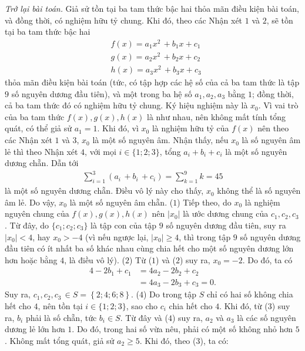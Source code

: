 \begin{multicols}{2}
	\vskip 0.05cm
	\textit{Trở lại bài toán.}
	\vskip 0.05cm
	Giả sử tồn tại ba tam thức bậc hai thỏa mãn điều kiện bài toán, và đồng thời, có nghiệm hữu tỷ chung.
	Khi đó, theo các Nhận xét $1$ và $2$, sẽ tồn tại ba tam thức bậc hai
	\begin{align*}
		&f\left( x \right) = {a_1}{x^2}\, + {b_1}x + {c_1}\\
		&g\left( x \right) = {a_2}{x^2}\, + {b_2}x + {c_2}\\
		&h\left( x \right) = {a_3}{x^2}\, + {b_3}x + {c_3}
	\end{align*}
	thỏa mãn điều kiện bài toán (tức, có tập hợp các hệ số của cả ba tam thức là tập $9$ số nguyên dương đầu tiên), và một trong ba hệ số $a_1, a_2, a_3$  bằng $1$; đồng thời, cả ba tam thức đó có nghiệm hữu tỷ chung. Ký hiệu nghiệm này là $x_0$.
	\vskip 0.05cm 
	Vì vai trò của ba tam thức $f(x), g(x), h(x)$ là như nhau, nên không mất tính tổng quát, có thể giả sử $a_1 =1$. Khi đó, vì $x_0$  là nghiệm hữu tỷ của $f(x)$  nên theo các Nhận xét $1$ và $3$, $x_0$  là một số nguyên âm.
	\vskip 0.05cm
	Nhận thấy, nếu $x_0$  là số nguyên âm lẻ thì theo Nhận xét $4$, với mọi $i \in \{1; 2; 3\}$, tổng $a_i + b_i + c_i$ là một số nguyên dương chẵn. Dẫn tới
	\begin{align*}
		\sum\limits_{i = 1}^3 {\left( {{a_i}\, + {b_i}\, + {c_i}} \right)}  = \sum\limits_{k = 1}^9 k  = 45
	\end{align*}
	là một số nguyên dương chẵn. Điều vô lý này cho thấy, $x_0$ không thể là số nguyên âm lẻ. Do vậy, $x_0$  là một số nguyên âm chẵn. \hfill ($1$)
	\vskip 0.05cm
	Tiếp theo, do $x_0$  là nghiệm nguyên chung của $f(x), g(x), h(x)$  nên  $|x_0|$ là ước dương chung của $c_1 , c_2, c_3$. Từ đây, do $\{c_1;c_2;c_3\}$ là tập con của tập $9$ số nguyên dương đầu tiên, suy ra $|x_0| < 4$, hay $x_0 > -4$ (vì nếu ngược lại, $|x_0| \ge 4$,  thì trong tập $9$ số nguyên dương đầu tiên có ít nhất ba số khác nhau cùng chia hết cho một số nguyên dương lớn hơn hoặc bằng $4$, là điều vô lý).    \hfill ($2$)
	\vskip 0.05cm
	Từ ($1$) và ($2$) suy ra, $x_0 = -2$. Do đó, ta có
	\begin{align*}
		4 - 2{b_1} + {c_1} &= 4{a_2} - 2{b_2} + {c_2} \\
		&= 4{a_3} - 2{b_3} + {c_3} = 0. \tag{$3$}
	\end{align*}
	Suy ra, ${c_1},{c_2},{c_3}\, \in S = \left\{ {2;4;6;8} \right\}$. \hfill ($4$)
	\vskip 0.05cm
	Do trong tập $S$ chỉ có hai số không chia hết cho $4$, nên tồn tại $i \in \{1; 2; 3\}$, sao cho $c_i$ chia hết cho $4$. Khi đó, từ ($3$) suy ra,  $b_i$ phải là số chẵn, tức $b_i \in S$. Từ đây và ($4$) suy ra, $a_2$  và $a_3$ là các số nguyên dương lẻ lớn hơn $1$. Do đó, trong hai số vừa nêu, phải có một số không nhỏ hơn $5$. Không mất tổng quát, giả sử $a_2 \ge 5$.  Khi đó, theo ($3$), ta có:

\end{multicols}
